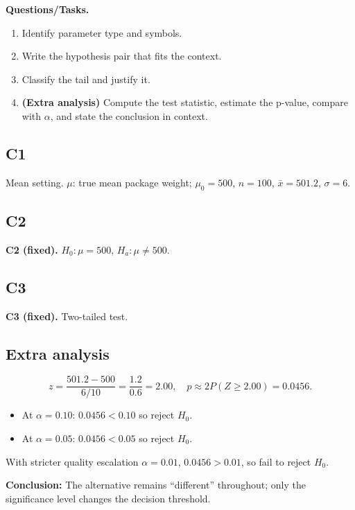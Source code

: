 \textbf{Questions/Tasks.}
\begin{enumerate}
    \item[(C1)] Identify parameter type and symbols.
    \item[(C2)] Write the hypothesis pair that fits the context.
    \item[(C3)] Classify the tail and justify it.
    \item[(EA)] \textbf{(Extra analysis)} Compute the test statistic, estimate the p-value, compare with \(\alpha\), and state the conclusion in context.
\end{enumerate}

\subsection*{C1}
Mean setting. \(\mu\): true mean package weight; \(\mu_0=500\), \(n=100\), \(\bar{x}=501.2\), \(\sigma=6\).

\subsection*{C2}
\textbf{C2 (fixed).} \(H_0:\mu=500\), \(H_a:\mu\ne 500\).

\subsection*{C3}
\textbf{C3 (fixed).} Two-tailed test. \TwoTailGraph

\subsection*{Extra analysis}
\[
z=\frac{501.2-500}{6/10}=\frac{1.2}{0.6}=2.00,
\quad p\approx 2P(Z\ge 2.00)=0.0456.
\]
\begin{itemize}
\item At \(\alpha=0.10\): \(0.0456<0.10\) so reject \(H_0\).
\item At \(\alpha=0.05\): \(0.0456<0.05\) so reject \(H_0\).
\end{itemize}
With stricter quality escalation \(\alpha=0.01\), \(0.0456>0.01\), so fail to reject \(H_0\).

\textbf{Conclusion:} The alternative remains ``different'' throughout; only the significance level changes the decision threshold.


